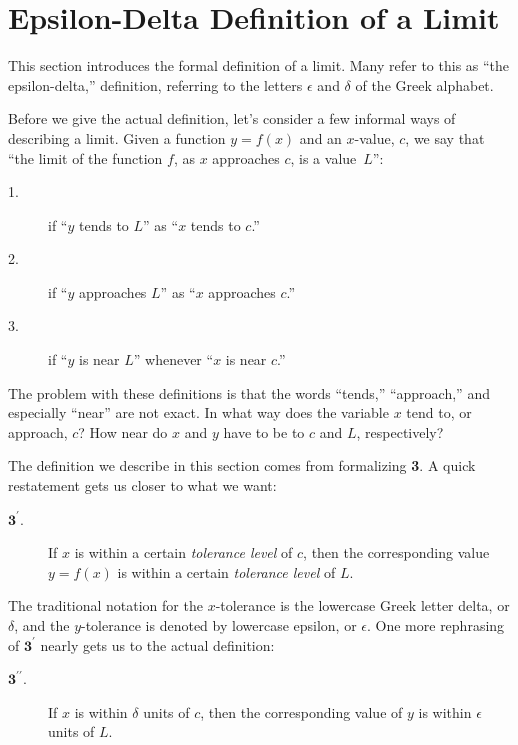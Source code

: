 
\section{Epsilon-Delta Definition of a Limit}\label{sec:limit_def}

This section introduces the formal definition of a limit. Many refer to this as ``the epsilon-delta,'' definition, referring to the letters $\epsilon$ and $\delta$ of the Greek alphabet.\bigskip

Before we give the actual definition, let's consider a few informal ways of describing a limit.  Given a function $y=f(x)$ and an $x$-value, $c$, we say that ``the limit of the function $f$, as $x$ approaches $c$, is a value~$L$'': 

\begin{description}
\item[1.]if ``$y$ tends to $L$'' as ``$x$ tends to $c$.''
\item[2.]if ``$y$ approaches $L$'' as ``$x$ approaches $c$.''
\item[3.]if ``$y$ is near $L$'' whenever ``$x$ is near $c$.''
\end{description}

The problem with these definitions is that the words ``tends,'' ``approach,'' and especially ``near'' are not exact.  In what way does the variable $x$ tend to, or approach, $c$? How near do $x$ and $y$ have to be to $c$ and $L$, respectively?\bigskip

The definition we describe in this section comes from formalizing \textbf{3}.  A quick restatement gets us closer to what we want:

\begin{description}
\item[$\textbf{3}^\prime$.]If $x$ is within a certain \textit{tolerance level} of $c$, then the corresponding value $y=f(x)$ is within a certain \textit{tolerance level} of $L$.
\end{description}

The traditional notation for the $x$-tolerance is the lowercase Greek letter delta, or $\delta$, and the $y$-tolerance is denoted by lowercase epsilon, or $\epsilon$. One more rephrasing of $\textbf{3}^\prime$ nearly gets us to the actual definition:

\begin{description}
\item[$\textbf{3}^{\prime \prime}$.]If $x$ is within $\delta$ units of $c$, then the corresponding value of $y$ is within $\epsilon$ units of $L$.
\end{description}

